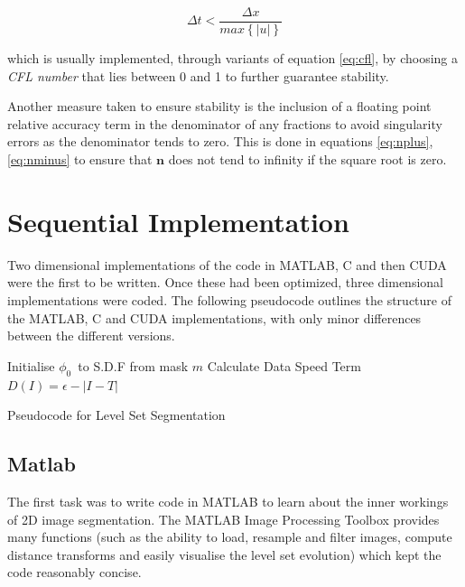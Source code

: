 \begin{equation}
\Delta t < \frac{\Delta x}{max\left\{|u|\right\}}
\label{eq:cfl}
\end{equation}

which is usually implemented, through variants of equation \eqref{eq:cfl}, by choosing a \textit{CFL number} that lies between 0 and 1 to further guarantee stability.

Another measure taken to ensure stability is the inclusion of a floating point relative accuracy term in the denominator of any fractions to avoid singularity errors as the denominator tends to zero. This is done in equations \eqref{eq:nplus},\eqref{eq:nminus} to ensure that $\textbf{n}$ does not tend to infinity if the square root is zero.

\section{Sequential Implementation}
Two dimensional implementations of the code in MATLAB, C and then CUDA were the first to be written. Once these had been optimized, three dimensional implementations were coded. The following pseudocode outlines the structure of the MATLAB, C and CUDA implementations, with only minor differences between the different versions.

\begin{algorithm}[h]
\BlankLine
\dontprintsemicolon
{}
\BlankLine
\SetLine
Initialise $\phi_0$\ to S.D.F from mask $m$\;
Calculate Data Speed Term $D(I)= \epsilon - |I-T|$\;
\caption{Pseudocode for Level Set Segmentation}\label{alg:alg}
\end{algorithm}


	\subsection{Matlab}
The first task was to write code in MATLAB to learn about the inner workings of 2D image segmentation. The MATLAB Image Processing Toolbox provides many functions (such as the ability to load, resample and filter images, compute distance transforms and easily visualise the level set evolution) which kept the code reasonably concise. 

